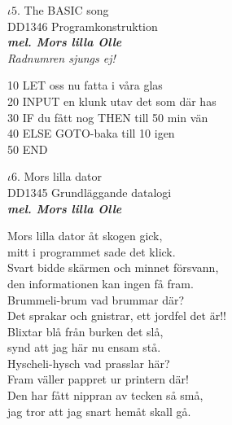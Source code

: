 \documentclass[a6paper,10pt]{article}
\newcommand{\mel}[1]{\small\textbf{\textit{mel. #1 \\}}}
\begin{document}
\setlength{\oddsidemargin}{-0.37in}
\noindent
\begin{center}
\Large $\iota5$. The BASIC song \\ 
\footnotesize DD1346 Programkonstruktion\\
\mel{Mors lilla Olle}
\textit{Radnumren sjungs ej!}
\end{center}
10 LET oss nu fatta i våra glas\\
 20 INPUT en klunk utav det som där has\\
 30 IF du fått nog THEN till 50 min vän\\
 40 ELSE GOTO-baka till 10 igen\\
 50 END
\vspace{30pt}
\begin{center}
\Large $\iota6$. Mors lilla dator \\ 
\footnotesize DD1345 Grundläggande datalogi\\
\mel{Mors lilla Olle}
\end{center}
Mors lilla dator åt skogen gick, \\
mitt i programmet sade det klick. \\
Svart bidde skärmen och minnet försvann, \\
den informationen kan ingen få fram. 
\vspace{5pt} \\
Brummeli-brum vad brummar där? \\
Det sprakar och gnistrar, ett jordfel det är!! \\
Blixtar blå från burken det slå, \\
synd att jag här nu ensam stå. 
\vspace{5pt} \\
Hyscheli-hysch vad prasslar här? \\
Fram väller pappret ur printern där! \\
Den har fått nippran av tecken så små, \\
jag tror att jag snart hemåt skall gå. 
\end{document}
